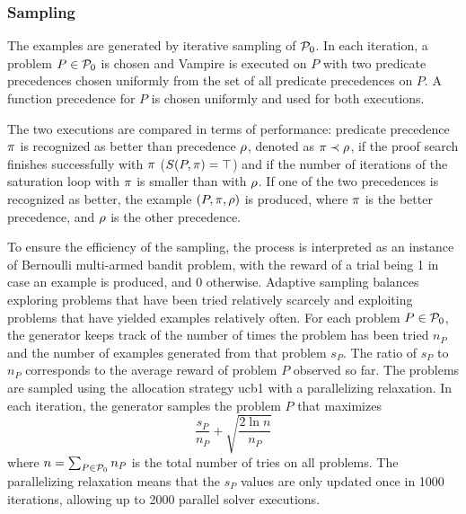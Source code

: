 \subsubsection{Sampling}

The examples are generated by iterative sampling of $\operatorname{\mathcal{P}_{0}}$.
In each iteration, a problem $P \in \operatorname{\mathcal{P}_{0}}$ is chosen and Vampire is executed on $P$
with two predicate precedences chosen uniformly from the set of all predicate precedences on $P$.
A function precedence for $P$ is chosen uniformly and used for both executions.

The two executions are compared in terms of performance:
predicate precedence $\pi$ is recognized as better than precedence $\rho$,
denoted as $\pi \prec \rho$,
if the proof search finishes successfully with $\pi$ ($S(P, \pi) = \top$)
and if the number of iterations of the saturation loop with $\pi$ is smaller than with $\rho$.
If one of the two precedences is recognized as better,
the example $(P, \pi, \rho)$ is produced,
where $\pi$ is the better precedence,
and $\rho$ is the other precedence.

To ensure the efficiency of the sampling, the process is interpreted as an instance of Bernoulli multi-armed bandit problem,
with the reward of a trial being 1 in case an example is produced, and 0 otherwise.
Adaptive sampling balances
exploring problems that have been tried relatively scarcely and
exploiting problems that have yielded examples relatively often.
For each problem $P \in \operatorname{\mathcal{P}_{0}}$,
the generator keeps track of the number of times the problem has been tried $n_P$
and the number of examples generated from that problem $s_P$.
The ratio of $s_P$ to $n_P$ corresponds to the average reward of problem $P$ observed so far.
The problems are sampled using the allocation strategy \acrshort{ucb1} \cite{Auer2002} with a parallelizing relaxation.
In each iteration, the generator samples the problem $P$ that maximizes
$$
\frac{s_P}{n_P} + \sqrt{\frac{2 \ln n}{n_P}}
$$
where $n = \sum_{P \in \operatorname{\mathcal{P}_{0}}} n_P$ is the total number of tries on all problems.
The parallelizing relaxation means that the $s_P$ values are only updated once in \num{1000} iterations,
allowing up to \num{2000} parallel solver executions.

